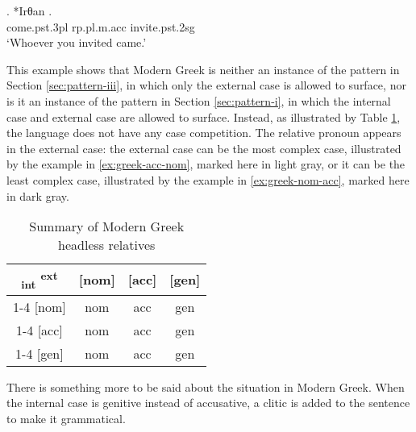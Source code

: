 \exg. *Irθan  .\\
come.\ac{pst}.3\ac{pl}\scsub{[nom]} \ac{rp}.\ac{pl}.\ac{m}.\ac{acc} invite.\ac{pst}.2\ac{sg}\scsub{[acc]}\\
`Whoever you invited came.'\label{ex:greek-nom-acc-u}

This example shows that Modern Greek is neither an instance of the pattern in Section \ref{sec:pattern-iii}, in which only the external case is allowed to surface, nor is it an instance of the pattern in Section \ref{sec:pattern-i}, in which the internal case and external case are allowed to surface.
Instead, as illustrated by Table \ref{tbl:no-case-competition-greek}, the language does not have any case competition. The relative pronoun appears in the external case: the external case can be the most complex case, illustrated by the example in \ref{ex:greek-acc-nom}, marked here in light gray, or it can be the least complex case, illustrated by the example in \ref{ex:greek-nom-acc}, marked here in dark gray.

\begin{table}[ht]
  \center
  \caption{Summary of Modern Greek headless relatives}
  \begin{tabular}{c|c|c|c}
    \toprule
   \textsubscript{\ac{int}} \textsuperscript{\ac{ext}}
          & [\ac{nom}]
          & [\ac{acc}]
          & [\ac{gen}]
          \\ \cmidrule{1-4}
      [\ac{nom}]
          & \ac{nom}
          & \cellcolor{LG}\ac{acc}
          & \ac{gen}
          \\ \cmidrule{1-4}
      [\ac{acc}]
          & \cellcolor{DG}\ac{nom}
          & \ac{acc}
          & \ac{gen}
          \\ \cmidrule{1-4}
      [\ac{gen}]
          & \ac{nom}
          & \ac{acc}
          & \ac{gen}
          \\
    \bottomrule
  \end{tabular}
  \label{tbl:no-case-competition-greek}
\end{table}

There is something more to be said about the situation in Modern Greek. When the internal case is genitive instead of accusative, a clitic is added to the sentence to make it grammatical.

